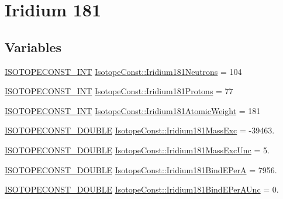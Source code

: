 \hypertarget{group___isotope_const-_iridium-_ir181}{}\section{Iridium 181}
\label{group___isotope_const-_iridium-_ir181}
\subsection*{Variables}
\begin{DoxyCompactItemize}
\item 
\mbox{\hyperlink{group___isotope_const-_macros_ga5f18360b3e99483a35c32d789e62621c}{I\+S\+O\+T\+O\+P\+E\+C\+O\+N\+S\+T\+\_\+\+I\+NT}} \mbox{\hyperlink{group___isotope_const-_iridium-_ir181_ga74da23632dfb9a040200232914587531}{Isotope\+Const\+::\+Iridium181\+Neutrons}} = 104
\item 
\mbox{\hyperlink{group___isotope_const-_macros_ga5f18360b3e99483a35c32d789e62621c}{I\+S\+O\+T\+O\+P\+E\+C\+O\+N\+S\+T\+\_\+\+I\+NT}} \mbox{\hyperlink{group___isotope_const-_iridium-_ir181_ga58ead8a15ffbc38d2db26fa635557cc8}{Isotope\+Const\+::\+Iridium181\+Protons}} = 77
\item 
\mbox{\hyperlink{group___isotope_const-_macros_ga5f18360b3e99483a35c32d789e62621c}{I\+S\+O\+T\+O\+P\+E\+C\+O\+N\+S\+T\+\_\+\+I\+NT}} \mbox{\hyperlink{group___isotope_const-_iridium-_ir181_ga95a4e7aea7f66972396300209cfed361}{Isotope\+Const\+::\+Iridium181\+Atomic\+Weight}} = 181
\item 
\mbox{\hyperlink{group___isotope_const-_macros_ga8f45a7272ce02c0b4c65c44636ed719a}{I\+S\+O\+T\+O\+P\+E\+C\+O\+N\+S\+T\+\_\+\+D\+O\+U\+B\+LE}} \mbox{\hyperlink{group___isotope_const-_iridium-_ir181_ga4dd0cbc652300ac493b624d147529eac}{Isotope\+Const\+::\+Iridium181\+Mass\+Exc}} = -\/39463.
\item 
\mbox{\hyperlink{group___isotope_const-_macros_ga8f45a7272ce02c0b4c65c44636ed719a}{I\+S\+O\+T\+O\+P\+E\+C\+O\+N\+S\+T\+\_\+\+D\+O\+U\+B\+LE}} \mbox{\hyperlink{group___isotope_const-_iridium-_ir181_gae44b7e1da5deb9b37586fbd07c82879b}{Isotope\+Const\+::\+Iridium181\+Mass\+Exc\+Unc}} = 5.
\item 
\mbox{\hyperlink{group___isotope_const-_macros_ga8f45a7272ce02c0b4c65c44636ed719a}{I\+S\+O\+T\+O\+P\+E\+C\+O\+N\+S\+T\+\_\+\+D\+O\+U\+B\+LE}} \mbox{\hyperlink{group___isotope_const-_iridium-_ir181_gab720458223a61636fe81d69cbb3f1e8e}{Isotope\+Const\+::\+Iridium181\+Bind\+E\+PerA}} = 7956.
\item 
\mbox{\hyperlink{group___isotope_const-_macros_ga8f45a7272ce02c0b4c65c44636ed719a}{I\+S\+O\+T\+O\+P\+E\+C\+O\+N\+S\+T\+\_\+\+D\+O\+U\+B\+LE}} \mbox{\hyperlink{group___isotope_const-_iridium-_ir181_ga42700defeaa2f4d76766181ba2b31374}{Isotope\+Const\+::\+Iridium181\+Bind\+E\+Per\+A\+Unc}} = 0.

\end{DoxyCompactItemize}
